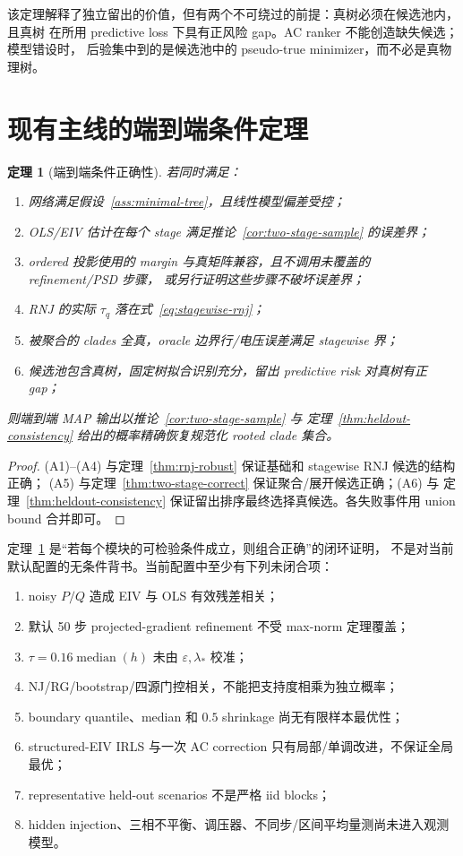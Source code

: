 \documentclass[UTF8,11pt]{ctexart}
\newtheorem{theorem}[definition]{定理}
\begin{document}
该定理解释了独立留出的价值，但有两个不可绕过的前提：真树必须在候选池内，且真树
在所用 predictive loss 下具有正风险 gap。AC ranker 不能创造缺失候选；模型错设时，
后验集中到的是候选池中的 pseudo-true minimizer，而不必是真物理树。

\section{现有主线的端到端条件定理}

\begin{theorem}[端到端条件正确性]
\label{thm:end-to-end}
若同时满足：
\begin{enumerate}[label=\textup{(A\arabic*)}]
\item 网络满足假设~\ref{ass:minimal-tree}，且线性模型偏差受控；
\item OLS/EIV 估计在每个 stage 满足推论~\ref{cor:two-stage-sample} 的误差界；
\item ordered 投影使用的 margin 与真矩阵兼容，且不调用未覆盖的 refinement/PSD 步骤，
或另行证明这些步骤不破坏误差界；
\item RNJ 的实际 $\tau_q$ 落在式~\eqref{eq:stagewise-rnj}；
\item 被聚合的 clades 全真，oracle 边界行/电压误差满足 stagewise 界；
\item 候选池包含真树，固定树拟合识别充分，留出 predictive risk 对真树有正 gap；
\end{enumerate}
则端到端 MAP 输出以推论~\ref{cor:two-stage-sample} 与
定理~\ref{thm:heldout-consistency} 给出的概率精确恢复规范化 rooted clade 集合。
\end{theorem}

\begin{proof}
(A1)--(A4) 与定理~\ref{thm:rnj-robust} 保证基础和 stagewise RNJ 候选的结构正确；
(A5) 与定理~\ref{thm:two-stage-correct} 保证聚合/展开候选正确；(A6) 与
定理~\ref{thm:heldout-consistency} 保证留出排序最终选择真候选。各失败事件用 union
bound 合并即可。
\end{proof}

定理~\ref{thm:end-to-end} 是“若每个模块的可检验条件成立，则组合正确”的闭环证明，
不是对当前默认配置的无条件背书。当前配置中至少有下列未闭合项：
\begin{enumerate}[leftmargin=2em]
\item noisy $P/Q$ 造成 EIV 与 OLS 有效残差相关；
\item 默认 50 步 projected-gradient refinement 不受 max-norm 定理覆盖；
\item $\tau=0.16\operatorname{median}(h)$ 未由 $\varepsilon,\lambda_*$ 校准；
\item NJ/RG/bootstrap/四源门控相关，不能把支持度相乘为独立概率；
\item boundary quantile、median 和 $0.5$ shrinkage 尚无有限样本最优性；
\item structured-EIV IRLS 与一次 AC correction 只有局部/单调改进，不保证全局最优；
\item representative held-out scenarios 不是严格 iid blocks；
\item hidden injection、三相不平衡、调压器、不同步/区间平均量测尚未进入观测模型。
\end{enumerate}
\end{document}
